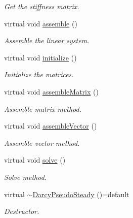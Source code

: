 \begin{DoxyCompactItemize}
\begin{DoxyCompactList}\small\item\em Get the stiffness matrix. \end{DoxyCompactList}\item 
virtual void \hyperlink{classFVCode3D_1_1DarcyPseudoSteady_3_01QRMatrix_00_01QRFracture_00_01MatrixType_00_01Implicit_01_4_a40521b96ed02d9d801a9f09f6bbca6cc}{assemble} ()
\begin{DoxyCompactList}\small\item\em Assemble the linear system. \end{DoxyCompactList}\item 
virtual void \hyperlink{classFVCode3D_1_1DarcyPseudoSteady_3_01QRMatrix_00_01QRFracture_00_01MatrixType_00_01Implicit_01_4_a992ed5e76ce902c7ffa07824f0494997}{initialize} ()
\begin{DoxyCompactList}\small\item\em Initialize the matrices. \end{DoxyCompactList}\item 
virtual void \hyperlink{classFVCode3D_1_1DarcyPseudoSteady_3_01QRMatrix_00_01QRFracture_00_01MatrixType_00_01Implicit_01_4_a7af420a3ce0705987d1e83670f92e050}{assemble\+Matrix} ()
\begin{DoxyCompactList}\small\item\em Assemble matrix method. \end{DoxyCompactList}\item 
virtual void \hyperlink{classFVCode3D_1_1DarcyPseudoSteady_3_01QRMatrix_00_01QRFracture_00_01MatrixType_00_01Implicit_01_4_abbd82a04eb7c2905f8207a80ed21532d}{assemble\+Vector} ()
\begin{DoxyCompactList}\small\item\em Assemble vector method. \end{DoxyCompactList}\item 
virtual void \hyperlink{classFVCode3D_1_1DarcyPseudoSteady_3_01QRMatrix_00_01QRFracture_00_01MatrixType_00_01Implicit_01_4_a60bcb1a13f01071aac73f9e5e590f049}{solve} ()
\begin{DoxyCompactList}\small\item\em Solve method. \end{DoxyCompactList}\item 
virtual \hyperlink{classFVCode3D_1_1DarcyPseudoSteady_3_01QRMatrix_00_01QRFracture_00_01MatrixType_00_01Implicit_01_4_afd5575ca0dc0047e15938af3ddb84910}{$\sim$\+Darcy\+Pseudo\+Steady} ()=default
\begin{DoxyCompactList}\small\item\em Destructor. \end{DoxyCompactList}\end{DoxyCompactItemize}
